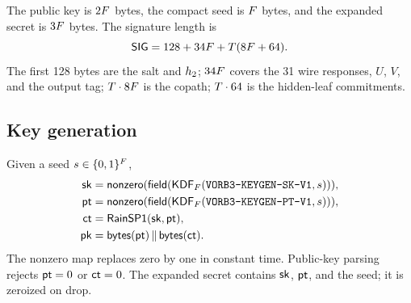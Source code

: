 \documentclass[11pt,a4paper]{article}
\begin{document}
\begin{table}[ht]
\centering
\small
\caption{Shipped profiles. $F$ is the field width in bytes, $T$ the tree
count. The conservative floor is the minimum of the component floors; it is
not a certification.}
\label{tab:profiles}
\end{table}

The public key is $2F$ bytes, the compact seed is $F$ bytes, and
the expanded secret is $3F$ bytes. The signature length is
\begin{equation}
\mathsf{SIG}=128+34F+T(8F+64).
\label{eq:siglen}
\end{equation}
The first 128 bytes are the salt and $h_2$; $34F$ covers the 31
wire responses, $U$, $V$, and the output tag; $T\cdot8F$ is the
copath; $T\cdot64$ is the hidden-leaf commitments.

\subsection{Key generation}

Given a seed $s\in\{0,1\}^{F}$,
\begin{align}
\mathsf{sk} &= \mathsf{nonzero}(\mathsf{field}(\mathsf{KDF}_F(\texttt{VORB3-KEYGEN-SK-V1},s))),\\
\mathsf{pt} &= \mathsf{nonzero}(\mathsf{field}(\mathsf{KDF}_F(\texttt{VORB3-KEYGEN-PT-V1},s))),\\
\mathsf{ct} &= \mathsf{RainSP1}(\mathsf{sk},\mathsf{pt}),\\
\mathsf{pk} &= \mathsf{bytes}(\mathsf{pt})\,\|\,\mathsf{bytes}(\mathsf{ct}).
\end{align}
The nonzero map replaces zero by one in constant time. Public-key parsing
rejects $\mathsf{pt}=0$ or $\mathsf{ct}=0$. The expanded secret contains $\mathsf{sk}$, $\mathsf{pt}$, and
the seed; it is zeroized on drop.
\end{document}
